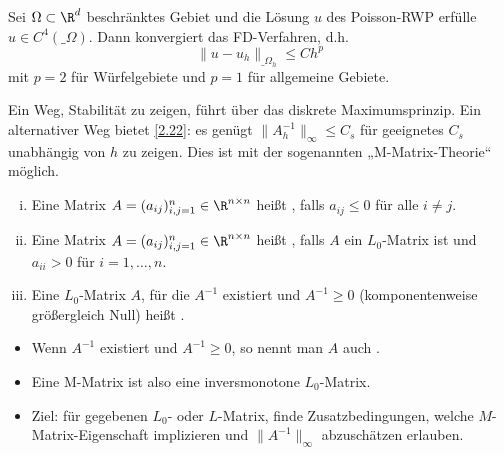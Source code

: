 \begin{kor} \label{2.26}
	Sei $\Omega \subset \R^d$ beschränktes Gebiet und die Lösung $u$ des Poisson-RWP erfülle $u \in C^4(\_\Omega)$.
	Dann konvergiert das FD-Verfahren, d.h.
	\[
		\|u - u_h\|_{\_\Omega_h}
		\le C h^p
	\]
	mit $p = 2$ für Würfelgebiete und $p = 1$ für allgemeine Gebiete.
\end{kor}

Ein Weg, Stabilität zu zeigen, führt über das diskrete Maximumsprinzip.
Ein alternativer Weg bietet \ref{2.22}:
es genügt $\|A_h^{-1}\|_\infty \le C_s$ für geeignetes $C_s$ unabhängig von $h$ zu zeigen.
Dies ist mit der sogenannten „M-Matrix-Theorie“ möglich.

\begin{df} \label{2.27}
	\begin{enumerate}[i)]
		\item
			Eine Matrix $A = (a_{ij})_{i,j=1}^n \in \R^{n\times n}$ heißt , falls $a_{ij} \le 0$ für alle $i \neq j$.
		\item
			Eine Matrix $A = (a_{ij})_{i,j=1}^n \in \R^{n\times n}$ heißt , falls $A$ ein $L_0$-Matrix ist und $a_{ii} > 0$ für $i= 1, \dotsc, n$.
		\item
			Eine $L_0$-Matrix $A$, für die $A^{-1}$ existiert und $A^{-1} \ge 0$ (komponentenweise größergleich Null) heißt .
	\end{enumerate}
	\begin{note}
		\begin{itemize}
			\item
				Wenn $A^{-1}$ existiert und $A^{-1} \ge 0$, so nennt man $A$ auch .
			\item
				Eine M-Matrix ist also eine inversmonotone $L_0$-Matrix.
			\item
				Ziel: für gegebenen $L_0$- oder $L$-Matrix, finde Zusatzbedingungen, welche $M$-Matrix-Eigenschaft implizieren und $\|A^{-1}\|_\infty$ abzuschätzen erlauben.
		\end{itemize}
	\end{note}
\end{df}

